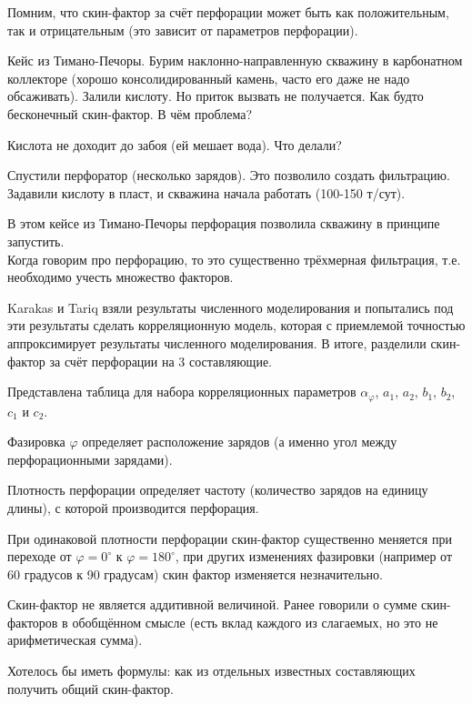 \documentclass[main.tex]{subfiles}
\begin{document}

Помним, что скин-фактор за счёт перфорации может быть как положительным, так и отрицательным (это зависит от параметров перфорации).

Кейс из Тимано-Печоры. Бурим наклонно-направленную скважину в карбонатном коллекторе (хорошо консолидированный камень, часто его даже не надо обсаживать). Залили кислоту. Но приток вызвать не получается. Как будто бесконечный скин-фактор. В чём проблема?

Кислота не доходит до забоя (ей мешает вода). Что делали?

Спустили перфоратор (несколько зарядов). Это позволило создать фильтрацию. Задавили кислоту в пласт, и скважина начала работать (100-150 т/сут).

В этом кейсе из Тимано-Печоры перфорация позволила скважину в принципе запустить.\\

Когда говорим про перфорацию, то это существенно трёхмерная фильтрация, т.е. необходимо учесть множество факторов.

Karakas и Tariq взяли результаты численного моделирования и попытались под эти результаты сделать корреляционную модель, которая с приемлемой точностью аппроксимирует результаты численного моделирования. В итоге, разделили скин-фактор за счёт перфорации на 3 составляющие.\\


Представлена таблица для набора корреляционных параметров $\alpha_\varphi$, $a_1$, $a_2$, $b_1$, $b_2$, $c_1$ и $c_2$.

Фазировка $\varphi$ определяет расположение зарядов (а именно угол между перфорационными зарядами).

Плотность перфорации определяет частоту (количество зарядов на единицу длины), с которой производится перфорация.

При одинаковой плотности перфорации скин-фактор существенно меняется при переходе от $\varphi=0^{\circ}$ к $\varphi=180^{\circ}$, при других изменениях фазировки (например от 60 градусов к 90 градусам) скин фактор изменяется незначительно.


Скин-фактор не является аддитивной величиной. Ранее говорили о сумме скин-факторов в обобщённом смысле (есть вклад каждого из слагаемых, но это не арифметическая сумма).

Хотелось бы иметь формулы: как из отдельных известных составляющих получить общий скин-фактор.
\end{document}
